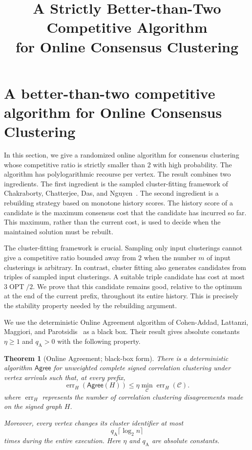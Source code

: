 \documentclass[11pt]{article}
\title{A Strictly Better-than-Two Competitive Algorithm\\
for Online Consensus Clustering}
\author{}
\date{}
\newtheorem{theorem}{Theorem}
\theoremstyle{definition}
\theoremstyle{remark}
\newcommand{\C}{\mathcal C}
\newcommand{\OPT}{\operatorname{OPT}}
\newcommand{\err}{\operatorname{err}}
\newcommand{\Agree}{\mathsf{Agree}}
\newcommand{\1}{\mathbf 1}
\begin{document}
\maketitle

\section{A better-than-two competitive algorithm for Online Consensus Clustering}

In this section, we give a randomized online algorithm for consensus
clustering whose competitive ratio is strictly smaller than $2$ with high
probability.  The algorithm has polylogarithmic recourse per vertex.  The
result combines two ingredients.  The first ingredient is the sampled
cluster-fitting framework of Chakraborty, Chatterjee, Das, and
Nguyen~\cite{ChakrabortyEtAl2026}.  The second ingredient is a rebuilding
strategy based on monotone history scores.  The history score of a candidate
is the maximum consensus cost that the candidate has incurred so far.  This
maximum, rather than the current cost, is used to decide when the maintained
solution must be rebuilt.

The cluster-fitting framework is crucial.  Sampling only input clusterings
cannot give a competitive ratio bounded away from $2$ when the number $m$ of
input clusterings is arbitrary.  In contrast, cluster fitting also generates
candidates from triples of sampled input clusterings.  A suitable triple
candidate has cost at most $3\OPT/2$.  We prove that this candidate remains
good, relative to the optimum at the end of the current prefix, throughout
its entire history.  This is precisely the stability property needed by the
rebuilding argument.

We use the deterministic Online Agreement algorithm of Cohen-Addad,
Lattanzi, Maggiori, and Parotsidis~\cite{CohenAddadEtAl2022} as a black box.
Their result gives absolute constants $\eta\ge1$ and $q_{\mathrm A}>0$ with
the following property.

\begin{theorem}[Online Agreement; black-box form]\label{thm:online-agreement}
There is a deterministic algorithm $\Agree$ for unweighted complete signed
correlation clustering under vertex arrivals such that, at every prefix,
\[
  \err_H(\Agree(H))\le \eta\min_{\C}\err_H(\C).
\]
where $\err_H$ represents the number of correlation clustering disagreements made on the signed graph $H$.

Moreover, every vertex changes its cluster identifier at most
\[
  q_{\mathrm A}\lceil\log_2 n\rceil
\]
times during the entire execution.  Here $\eta$ and $q_{\mathrm A}$ are
absolute constants.
\end{theorem}
\end{document}
